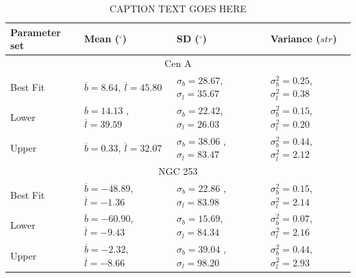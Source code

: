 \documentclass[12pt, a4 paper]{mnras}
\begin{document}
\label{AD_table}
\begin{table}
\centering
\caption{CAPTION TEXT GOES HERE}
\begin{tabular}{|p{}|p{}|p{}|p{}|}
    \hline
    Parameter set & Mean (${}^\circ$)& SD (${}^\circ$) & Variance ($str$)\\
    \hline
    \multicolumn{4}{|c|}{Cen A} \\ 
    \hline
    \rule{0pt}{3ex} 
    Best Fit & $\overline{b} = 8.64$, $\overline{l} = 45.80 $& $\sigma_{b} = 28.67 $, $\sigma_{l} = 35.67$ & $\sigma^2_{b} = 0.25 $, $\sigma^2_{l} = 0.38$ \\
    \hline
    \rule{0pt}{3ex} 
     Lower & $\overline{b} = 14.13$  , $\overline{l} = 39.59$ & $\sigma_{b} = 22.42$, $\sigma_{l} = 26.03$ & $\sigma^2_{b} = 0.15 $, $\sigma^2_{l} = 0.20$\\
    \hline
    \rule{0pt}{3ex} 
     Upper & $\overline{b} = 0.33$, $\overline{l} = 32.07$ & $\sigma_{b} = 38.06$ , $\sigma_{l} = 83.47$ & $\sigma^2_{b} = 0.44 $, $\sigma^2_{l} = 2.12$\\
    \hline
  \multicolumn{4}{|c|}{NGC 253} \\ 
    \hline
    \rule{0pt}{3ex} 
    Best Fit & $\overline{b} = -48.89$, $\overline{l} = -1.36$  & $\sigma_{b} = 22.86$ , $\sigma_{l} = 83.98$ & $\sigma^2_{b} = 0.15 $, $\sigma^2_{l} = 2.14$ \\
    \hline
    \rule{0pt}{3ex} 
     Lower & $\overline{b} = -60.90 $, $\overline{l} = -9.43$ & $\sigma_{b} = 15.69$, $\sigma_{l} = 84.34 $ & $\sigma^2_{b} = 0.07 $, $\sigma^2_{l} = 2.16$\\
    \hline
    \rule{0pt}{3ex} 
     Upper & $\overline{b} = -2.32$, $\overline{l} = -8.66$ & $\sigma_{b} = 39.04$ , $\sigma_{l} = 98.20 $& $\sigma^2_{b} = 0.44 $, $\sigma^2_{l} = 2.93$\\
    \hline
\end{tabular}
\end{table}

\end{document}
